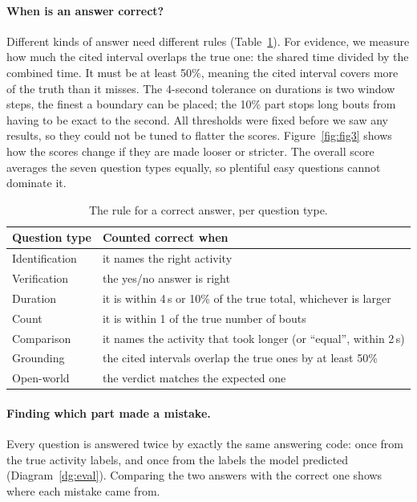 \documentclass[11pt,a4paper]{article}
\begin{document}
\paragraph{When is an answer correct?} Different kinds of answer need different rules (Table~\ref{tab:rules}). For evidence, we measure how much the cited interval overlaps the true one: the shared time divided by the combined time. It must be at least 50\%, meaning the cited interval covers more of the truth than it misses. The 4-second tolerance on durations is two window steps, the finest a boundary can be placed; the 10\% part stops long bouts from having to be exact to the second. All thresholds were fixed before we saw any results, so they could not be tuned to flatter the scores. Figure~\ref{fig:fig3} shows how the scores change if they are made looser or stricter. The overall score averages the seven question types equally, so plentiful easy questions cannot dominate it.

\begin{table}[h]
\centering\small
\begin{tabular}{@{}ll@{}}
\toprule
Question type & Counted correct when \\
\midrule
Identification & it names the right activity \\
Verification & the yes/no answer is right \\
Duration & it is within 4\,s or 10\% of the true total, whichever is larger \\
Count & it is within 1 of the true number of bouts \\
Comparison & it names the activity that took longer (or ``equal'', within 2\,s) \\
Grounding & the cited intervals overlap the true ones by at least 50\% \\
Open-world & the verdict matches the expected one \\
\bottomrule
\end{tabular}
\caption{The rule for a correct answer, per question type.}
\label{tab:rules}
\end{table}

\paragraph{Finding which part made a mistake.} Every question is answered twice by exactly the same answering code: once from the true activity labels, and once from the labels the model predicted (Diagram~\ref{dg:eval}). Comparing the two answers with the correct one shows where each mistake came from.
\end{document}
